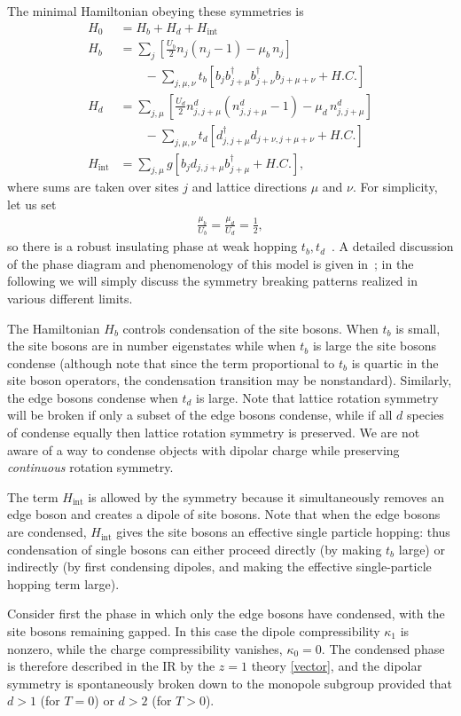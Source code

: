 \documentclass[prb,aps,twocolumn, amsfonts,amsmath,amssymb,nofootinbib,superscriptaddress]{revtex4-2}
\newcommand{\nn}{\nonumber\\}
\begin{document}
The minimal Hamiltonian obeying these symmetries is  
\begin{align}
H_0  &= H_b + H_d + H_\text{int}\nn
H_b &= \sum_j \left[ \frac{U_b}{2}  n_j (n_j-1) - \mu_b \, n_j \right] \nn
&\qquad - \sum_{j,\mu,\nu} t_b \left[  b_j b^{\dag}_{j+\mu} b^{\dag}_{j+\nu} b_{j+\mu+\nu} + H.C. \right]\nn
H_d &= \sum_{j,\mu} \left[ \frac{U_d}{2} n^d_{j,j+\mu} (n^d_{j,j+\mu} - 1) -\mu_d \, n^d_{j, j + \mu} \right]\nn
&\qquad  - \sum_{j,\mu,\nu} t_d \left[d^{\dag}_{j, j + \mu} d_{j + \nu, j+\mu + \nu} +H.C.\right]\nn
H_\text{int} &= \sum_{j,\mu} g\left[ b_j d_{j,j+\mu} b^\dag_{j+\mu} + H.C. \right],
\end{align}
where sums are taken over sites $j$ and lattice directions $\mu$ and $\nu$.  
For simplicity, let us set 
\begin{align}
\frac{\mu_b}{ U_b} = \frac{\mu_d }{ U_d} = \frac{1}{2},
\end{align}
so there is a robust insulating phase at weak hopping $t_b, t_d$~\cite{Fisheretal}. A detailed discussion of the phase diagram and phenomenology of this model is given in~\cite{dbhm}; in the following we will simply discuss the symmetry breaking patterns realized in various different limits. 

The Hamiltonian $H_b$ controls condensation of the site bosons. When $t_b$ is small, the site bosons are in number eigenstates while when $t_b$ is large the site bosons condense (although note that since the term proportional to $t_b$ is quartic in the site boson operators, the condensation transition may be nonstandard). Similarly, the edge bosons condense when $t_d$ is large. Note that lattice rotation symmetry will be broken if only a subset of the edge bosons condense, while if all $d$ species of condense equally then lattice rotation symmetry is preserved. We are not aware of a way to condense objects with dipolar charge while preserving {\it continuous} rotation symmetry. 

The term $H_\text{int}$ is allowed by the symmetry because it simultaneously removes an edge boson and creates a dipole of site bosons. Note that when the edge bosons are condensed, $H_\text{int}$ gives the site bosons an effective single particle hopping: thus condensation of single bosons can either proceed directly (by making $t_b$ large) or indirectly (by first condensing dipoles, and making the effective single-particle hopping term large). 

Consider first the phase in which only the edge bosons have condensed, with the site bosons remaining gapped. In this case the dipole compressibility $\kappa_1$ is nonzero, while the charge compressibility vanishes, $\kappa_0=0$. The condensed phase is therefore described in the IR by the $z=1$ theory \eqref{vector}, and the dipolar symmetry is spontaneously broken down to the monopole subgroup provided that $d>1$ (for $T=0$) or $d>2$ (for $T>0$). 
\end{document}
